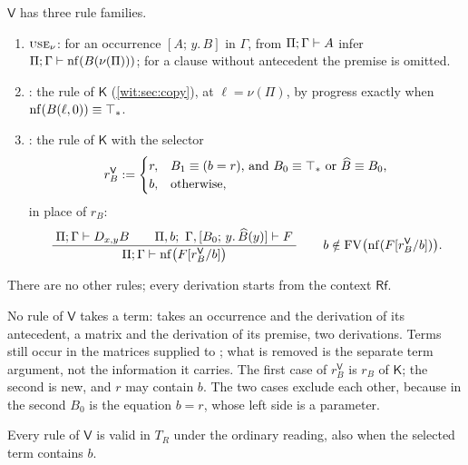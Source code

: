 \begin{definition}
\label{wit:def:v}
$\mathsf V$ has three rule families.
\begin{enumerate}[label=\textup{(\roman*)}]
\item $\rulename{Use}_\nu$: for an occurrence $[A;\,y.\,B]$ in $\Gamma$, from
 $\Pi;\Gamma\vdash A$ infer $\Pi;\Gamma\vdash\operatorname{nf}(B(\nu(\Pi)))$; for a
 clause without antecedent the premise is omitted.
\item {}: the rule  of $\mathsf K$
 (\cref{wit:sec:copy}), at $\ell=\nu(\Pi)$, by progress exactly when
 $\operatorname{nf}(B(\ell,0))\equiv\top_{*}$.
\item {}: the rule  of $\mathsf K$ with the
 selector
\[
 r^{\mathsf V}_B\mathrel{:=}
 \begin{cases}
  r,&\text{$B_1\equiv(b=r)$, and $B_0\equiv\top_{*}$ or
        $\widehat B\equiv B_0$,}\\
  b,&\text{otherwise,}
 \end{cases}
\]
 in place of $r_B$:
\[
 \dfrac{\;\Pi;\Gamma\vdash D_{x,y}B\qquad
          \Pi,b;\ \Gamma,[B_0;\,y.\,\widehat B(y)]\vdash F\;}{\;\Pi;\Gamma\vdash\operatorname{nf}\bigl(F[r^{\mathsf V}_B/b]\bigr)\;}
 \qquad b\notin\operatorname{FV}\bigl(\operatorname{nf}(F[r^{\mathsf V}_B/b])\bigr).
\]
\end{enumerate}
There are no other rules; every derivation starts from the context
$\mathsf{Rf}$.
\end{definition}

No rule of $\mathsf V$ takes a term:  takes an occurrence and
the derivation of its antecedent,  a matrix and the
derivation of its premise,  two derivations.  Terms still
occur in the matrices supplied to ; what is removed is the
separate term argument, not the information it carries.  The first case of
$r^{\mathsf V}_B$ is $r_B$ of $\mathsf K$; the second is new, and $r$ may
contain $b$.  The two cases exclude each other, because in the second $B_0$
is the equation $b=r$, whose left side is a parameter.

\begin{lemma}
\label{wit:lem:v-sound}
Every rule of $\mathsf V$ is valid in $T_R$ under the ordinary reading, also
when the selected term contains $b$.
\end{lemma}

